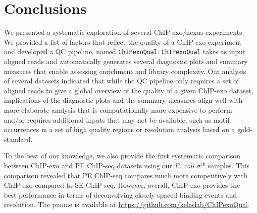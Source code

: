 \documentclass{bmcart}
\newcommand{\pname}[1]{\texttt{ChIPexoQual}}
\newcommand{\sig}{\sigma^{70}}
\begin{document}
\section*{Conclusions}
\label{sec:conc}

We presented a systematic exploration of several ChIP-exo/nexus experiments. We
provided a list of factors that reflect the quality of a ChIP-exo
experiment and developed a QC pipeline, named \pname{}. \pname{} takes as input aligned reads and automatically generates several diagnostic plots and summary measures that enable assessing enrichment and library complexity.
Our analysis of several datasets indicated that
while the QC pipeline only requires a set of aligned reads
to give a global overview of the quality of a given ChIP-exo dataset, 
implications of the diagnostic plots and the summary measures align well
with more elaborate analysis that is computationally more
expensive to perform and/or requires additional inputs that may not be
available, such as motif occurrences in a set of high quality regions or
resolution analysis based on a gold-standard.


To the best of our knowledge, we also provide the first systematic comparison 
between ChIP-exo and PE ChIP-seq datasets using our \textit{E. coli} $\sig$ samples. 
This comparison revealed that PE ChIP-seq compares much more competitively with ChIP-exo compared to SE ChIP-seq. However,
overall, ChIP-exo provides the best performance in terms of deconvolving closely spaced binding events and resolution.
The pname{} is available at \url{https://github.com/keleslab/ChIPexoQual}.
\end{document}
